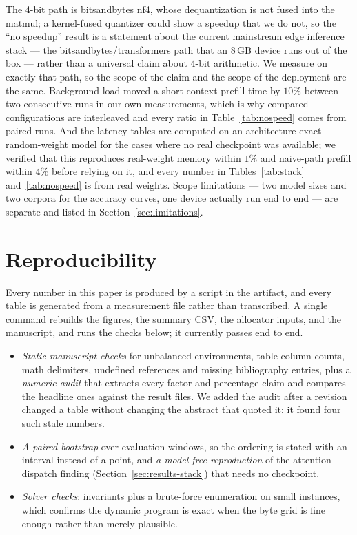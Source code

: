 \documentclass[10pt,journal]{IEEEtran}
\begin{document}
The 4-bit path is bitsandbytes nf4, whose dequantization is not fused into the
matmul; a kernel-fused quantizer could show a speedup that we do not, so the
``no speedup'' result is a statement about the current mainstream edge
inference stack --- the bitsandbytes/transformers path that an 8\,GB device
runs out of the box --- rather than a universal claim about 4-bit arithmetic.
We measure on exactly that path, so the scope of the claim and the scope of the
deployment are the same. Background load moved a short-context prefill time by
$10\%$ between two consecutive runs in our own measurements, which is why
compared configurations are interleaved and every ratio in
Table~\ref{tab:nospeed} comes from paired runs. And the latency tables are
computed on an architecture-exact random-weight model for the cases where no real
checkpoint was available; we verified that this reproduces real-weight memory
within $1\%$ and naive-path prefill within $4\%$ before relying on it, and every
number in Tables~\ref{tab:stack} and~\ref{tab:nospeed} is from real weights.
Scope limitations --- two model sizes and two corpora for the accuracy curves, one
device actually run end to end --- are separate and listed in
Section~\ref{sec:limitations}.

\section{Reproducibility}
\label{sec:repro}

Every number in this paper is produced by a script in the artifact, and every
table is generated from a measurement file rather than transcribed. A single
command rebuilds the figures, the summary CSV, the allocator inputs, and the
manuscript, and runs the checks below; it currently passes end to end.

\begin{itemize}
\item \emph{Static manuscript checks} for unbalanced environments, table column
      counts, math delimiters, undefined references and missing bibliography
      entries, plus a \emph{numeric audit} that extracts every factor and
      percentage claim and compares the headline ones against the result files.
      We added the audit after a revision changed a table without changing the
      abstract that quoted it; it found four such stale numbers.
\item \emph{A paired bootstrap} over evaluation windows, so the ordering is stated
      with an interval instead of a point, and \emph{a model-free reproduction} of
      the attention-dispatch finding (Section~\ref{sec:results-stack}) that needs
      no checkpoint.
\item \emph{Solver checks}: invariants plus a brute-force enumeration on small
      instances, which confirms the dynamic program is exact when the byte grid is
      fine enough rather than merely plausible.
\end{itemize}
\end{document}
